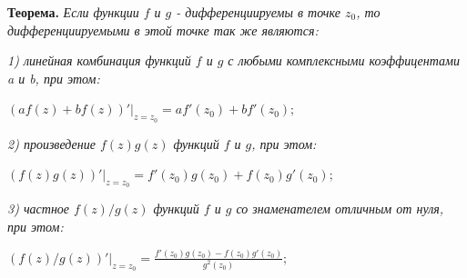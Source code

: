 \documentclass[a4paper, 12pt]{report}
\begin{document}
\par\bigskip
\textbf{Теорема.} \quad
\textsl{Если функции $f$ и $g$ - дифференциируемы в точке $z_0$, то дифференциируемыми в этой точке так же являются:}
\par
\textsl{1) линейная комбинация функций $f$ и $g$ с любыми комплексными коэффицентами a и b, при этом: }
\par\bigskip
\begin{center}
    $\left. (af(z) + bf(z))' \right |_{z=z_0} = af'(z_0) + bf'(z_0);$
\end{center}
\par\bigskip
\textsl{2) произведение $f(z)g(z)$ функций $f$ и $g$, при этом:}
\par\bigskip
\begin{center}
 $\left. (f(z)g(z))' \right |_{z=z_0} = f'(z_0)g(z_0) + f(z_0)g'(z_0);$
\end{center}
\par\bigskip
\textsl{3) частное $f(z)/g(z)$ функций $f$ и $g$ со знаменателем отличным от нуля, при этом:}
\par\bigskip
\begin{center}
 $\left. (f(z)/g(z))' \right |_{z=z_0} = \frac{f'(z_0)g(z_0) - f(z_0)g'(z_0)}{g^2(z_0)};$
\end{center}
\end{document}
